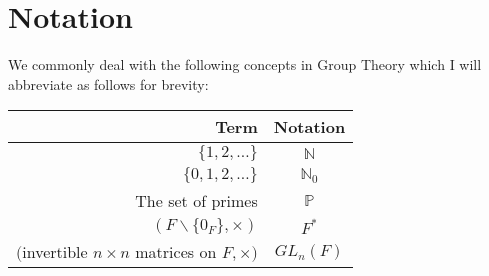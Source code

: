 \section{Notation}

We commonly deal with the following concepts in Group Theory
which I will abbreviate as follows for brevity:
\begin{center}
    \begin{tabular}{ | r | c | }
        \hline
        Term & Notation \\
        \hline \hline
        $\{1, 2, \ldots\}$ & $\mathbb{N}$ \\
        $\{0, 1, 2, \ldots\}$ & $\mathbb{N}_0$ \\
        The set of primes & $\mathbb{P}$ \\
        $(F \backslash \{0_F\}, \times)$ & $F^*$ \\
        $($invertible $n \times n$ matrices on $F$,$\,\times)$ & $GL_n(F)$ \\
        \hline
    \end{tabular}
\end{center}